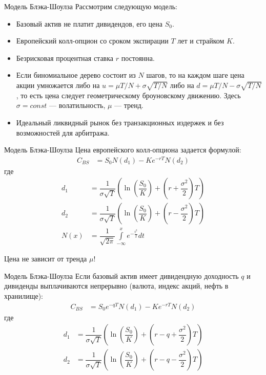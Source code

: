 \documentclass{beamer}
\begin{document}
\begin{frame}{Модель Блэка-Шоулза}
\justify
Рассмотрим следующую модель:
\begin{itemize}
\item Базовый актив не платит дивидендов, его цена $S_0$.
\item Европейский колл-опцион со сроком экспирации $T$ лет и страйком $K$.
\item Безрисковая процентная ставка $r$ постоянна.
\item Если биномиальное дерево состоит из $N$ шагов, то на каждом шаге цена акции умножается либо на $u = \mu T/N + \sigma\sqrt{T/N}$ либо на $d=\mu T/N - \sigma\sqrt{T/N}$, то есть цена следует геометрическому броуновскому движению. Здесь $\sigma=const$ --- волатильность, $\mu$ --- тренд.
\item Идеальный ликвидный рынок без транзакционных издержек и без возможностей для арбитража.
\end{itemize}
\end{frame}



\begin{frame}{Модель Блэка-Шоулза}
Цена европейского колл-опциона задается формулой:
\begin{align*}
C_{BS} &= S_0N(d_1) - Ke^{-rT}N(d_2)
\end{align*}
где
\begin{align*}
d_1 &= \dfrac{1}{\sigma\sqrt{T}}\left( \ln\left(\dfrac{S_0}{K}\right) + \left(r + \dfrac{\sigma^2}{2}\right)T\right) \\
d_2 &= \dfrac{1}{\sigma\sqrt{T}}\left( \ln\left(\dfrac{S_0}{K}\right) + \left(r - \dfrac{\sigma^2}{2}\right)T\right) \\
N(x) &= \dfrac{1}{\sqrt{2\pi}}\int\limits_{-\infty}^x e^{-\frac{t^2}{2}}dt
\end{align*}

\justify
Цена не зависит от тренда $\mu$!
\end{frame}



\begin{frame}{Модель Блэка-Шоулза}
Если базовый актив имеет дивидендную доходность $q$  и дивиденды выплачиваются непрерывно (валюта, индекс акций, нефть в хранилище):
\begin{align*}
C_{BS} &= S_0e^{-qT}N(d_1) - Ke^{-rT}N(d_2)
\end{align*}
где
\begin{align*}
d_1 &= \dfrac{1}{\sigma\sqrt{T}}\left( \ln\left(\dfrac{S_0}{K}\right) + \left(r -q + \dfrac{\sigma^2}{2}\right)T\right) \\
d_2 &= \dfrac{1}{\sigma\sqrt{T}}\left( \ln\left(\dfrac{S_0}{K}\right) + \left(r -q- \dfrac{\sigma^2}{2}\right)T\right)
\end{align*}
\end{frame}
\end{document}
